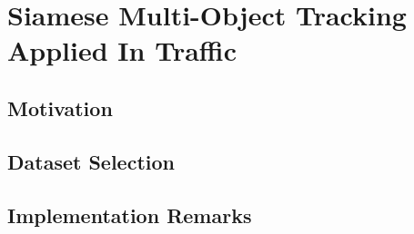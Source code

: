 \section{Siamese Multi-Object Tracking Applied In Traffic}
\label{sec:SiamMOTInTraffic}

\subsection{Motivation}

\subsection{Dataset Selection}

\subsection{Implementation Remarks}
